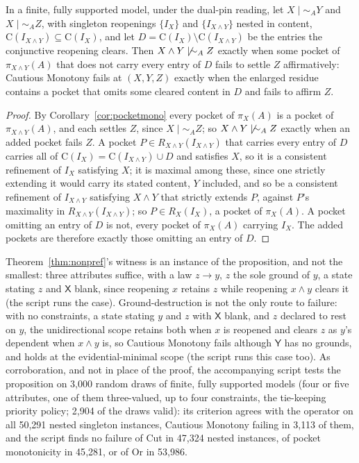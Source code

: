 \begin{proposition}\label{prop:cmwhere} In a finite, fully supported model, under the dual-pin reading, let $X \mid\sim_A Y$ and $X \mid\sim_A Z$, with singleton reopenings $\{I_X\}$ and $\{I_{X \wedge Y}\}$ nested in content, $\mathrm{C}(I_{X \wedge Y}) \subseteq \mathrm{C}(I_X)$, and let $D = \mathrm{C}(I_X) \setminus \mathrm{C}(I_{X \wedge Y})$ be the entries the conjunctive reopening clears. Then $X \wedge Y \not\mid\sim_A Z$ exactly when some pocket of $\pi_{X \wedge Y}(A)$ that does not carry every entry of $D$ fails to settle $Z$ affirmatively: Cautious Monotony fails at $(X, Y, Z)$ exactly when the enlarged residue contains a pocket that omits some cleared content in $D$ and fails to affirm $Z$.
\end{proposition}
\begin{proof}
By Corollary~\ref{cor:pocketmono} every pocket of $\pi_X(A)$ is a pocket of $\pi_{X \wedge Y}(A)$, and each settles $Z$, since $X \mid\sim_A Z$; so $X \wedge Y \not\mid\sim_A Z$ exactly when an added pocket fails $Z$. A pocket $P \in R_{X \wedge Y}(I_{X \wedge Y})$ that carries every entry of $D$ carries all of $\mathrm{C}(I_X) = \mathrm{C}(I_{X \wedge Y}) \cup D$ and satisfies $X$, so it is a consistent refinement of $I_X$ satisfying $X$; it is maximal among these, since one strictly extending it would carry its stated content, $Y$ included, and so be a consistent refinement of $I_{X \wedge Y}$ satisfying $X \wedge Y$ that strictly extends $P$, against $P$'s maximality in $R_{X \wedge Y}(I_{X \wedge Y})$; so $P \in R_X(I_X)$, a pocket of $\pi_X(A)$. A pocket omitting an entry of $D$ is not, every pocket of $\pi_X(A)$ carrying $I_X$. The added pockets are therefore exactly those omitting an entry of $D$.
\end{proof}
\noindent Theorem~\ref{thm:nonpref}'s witness is an instance of the proposition, and not the smallest: three attributes suffice, with a law $z \rightarrow y$, $z$ the sole ground of $y$, a state stating $z$ and $\mathsf{X}$ blank, since reopening $x$ retains $z$ while reopening $x \wedge y$ clears it (the script runs the case). Ground-destruction is not the only route to failure: with no constraints, a state stating $y$ and $z$ with $\mathsf{X}$ blank, and $z$ declared to rest on $y$, the unidirectional scope retains both when $x$ is reopened and clears $z$ as $y$'s dependent when $x \wedge y$ is, so Cautious Monotony fails although $\mathsf{Y}$ has no grounds, and holds at the evidential-minimal scope (the script runs this case too). As corroboration, and not in place of the proof, the accompanying script tests the proposition on 3{,}000 random draws of finite, fully supported models (four or five attributes, one of them three-valued, up to four constraints, the tie-keeping priority policy; 2{,}904 of the draws valid): its criterion agrees with the operator on all 50{,}291 nested singleton instances, Cautious Monotony failing in 3{,}113 of them, and the script finds no failure of Cut in 47{,}324 nested instances, of pocket monotonicity in 45{,}281, or of Or in 53{,}986.

